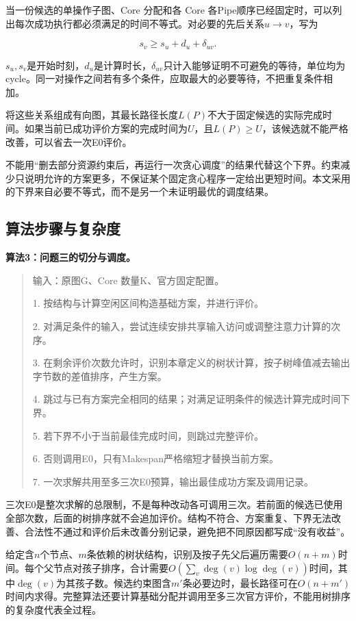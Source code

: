 \documentclass[anonymous,notoc]{gmcm2026}
\begin{document}
当一份候选的单操作子图、Core 分配和各 Core 各Pipe顺序已经固定时，可以列出每次成功执行都必须满足的时间不等式。对必要的先后关系\(u\to v\)，写为

\[s_v\ge s_u+d_u+\delta_{uv}.\]

\(s_u,s_v\)是开始时刻，\(d_u\)是计算时长，\(\delta_{uv}\)只计入能够证明不可避免的等待，单位均为cycle。同一对操作之间若有多个条件，应取最大的必要等待，不把重复条件相加。

将这些关系组成有向图，其最长路径长度\(L(P)\)不大于固定候选的实际完成时间。如果当前已成功评价方案的完成时间为\(U\)，且\(L(P)\ge U\)，该候选就不能严格改善，可以省去一次E0评价。

不能用``删去部分资源约束后，再运行一次贪心调度''的结果代替这个下界。约束减少只说明允许的方案更多，不保证某个固定贪心程序一定给出更短时间。本文采用的下界来自必要不等式，而不是另一个未证明最优的调度结果。

\subsection{算法步骤与复杂度}

\textbf{算法3：问题三的切分与调度。}

\begin{quote}
输入：原图G、Core 数量K、官方固定配置。

1. 按结构与计算空闲区间构造基础方案，并进行评价。

2. 对满足条件的输入，尝试连续安排共享输入访问或调整注意力计算的次序。

3. 在剩余评价次数允许时，识别本章定义的树状计算，按子树峰值减去输出字节数的差值排序，产生方案。

4. 跳过与已有方案完全相同的结果；对满足证明条件的候选计算完成时间下界。

5. 若下界不小于当前最佳完成时间，则跳过完整评价。

6. 否则调用E0，只有Makespan严格缩短才替换当前方案。

7. 一次求解共用至多三次E0预算，输出最佳成功方案及调用记录。
\end{quote}

三次E0是整次求解的总限制，不是每种改动各可调用三次。若前面的候选已使用全部次数，后面的树排序就不会追加评价。结构不符合、方案重复、下界无法改善、合法性不通过和评价后未改善分别记录，避免把不同原因都写成``没有收益''。

给定含\(n\)个节点、\(m\)条依赖的树状结构，识别及按子先父后遍历需要\(O(n+m)\)时间。每个父节点对孩子排序，合计需要\(O(\sum_v\deg(v)\log\deg(v))\)时间，其中\(\deg(v)\)为其孩子数。候选约束图含\(m'\)条必要边时，最长路径可在\(O(n+m')\)时间内求得。完整算法还要计算基础分配并调用至多三次官方评价，不能用树排序的复杂度代表全过程。
\end{document}

